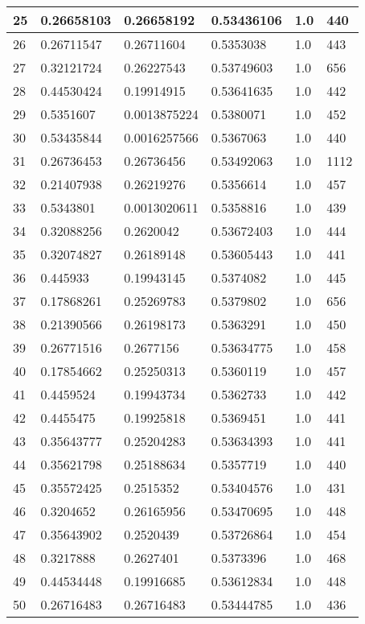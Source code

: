 \begin{longtable}{|l|l|l|l|l|l|}
25 & 0.26658103 & 0.26658192 & 0.53436106 & 1.0 & 440 \\ \hline 
26 & 0.26711547 & 0.26711604 & 0.5353038 & 1.0 & 443 \\ \hline 
27 & 0.32121724 & 0.26227543 & 0.53749603 & 1.0 & 656 \\ \hline 
28 & 0.44530424 & 0.19914915 & 0.53641635 & 1.0 & 442 \\ \hline 
29 & 0.5351607 & 0.0013875224 & 0.5380071 & 1.0 & 452 \\ \hline 
30 & 0.53435844 & 0.0016257566 & 0.5367063 & 1.0 & 440 \\ \hline 
31 & 0.26736453 & 0.26736456 & 0.53492063 & 1.0 & 1112 \\ \hline 
32 & 0.21407938 & 0.26219276 & 0.5356614 & 1.0 & 457 \\ \hline 
33 & 0.5343801 & 0.0013020611 & 0.5358816 & 1.0 & 439 \\ \hline 
34 & 0.32088256 & 0.2620042 & 0.53672403 & 1.0 & 444 \\ \hline 
35 & 0.32074827 & 0.26189148 & 0.53605443 & 1.0 & 441 \\ \hline 
36 & 0.445933 & 0.19943145 & 0.5374082 & 1.0 & 445 \\ \hline 
37 & 0.17868261 & 0.25269783 & 0.5379802 & 1.0 & 656 \\ \hline 
38 & 0.21390566 & 0.26198173 & 0.5363291 & 1.0 & 450 \\ \hline 
39 & 0.26771516 & 0.2677156 & 0.53634775 & 1.0 & 458 \\ \hline 
40 & 0.17854662 & 0.25250313 & 0.5360119 & 1.0 & 457 \\ \hline 
41 & 0.4459524 & 0.19943734 & 0.5362733 & 1.0 & 442 \\ \hline 
42 & 0.4455475 & 0.19925818 & 0.5369451 & 1.0 & 441 \\ \hline 
43 & 0.35643777 & 0.25204283 & 0.53634393 & 1.0 & 441 \\ \hline 
44 & 0.35621798 & 0.25188634 & 0.5357719 & 1.0 & 440 \\ \hline 
45 & 0.35572425 & 0.2515352 & 0.53404576 & 1.0 & 431 \\ \hline 
46 & 0.3204652 & 0.26165956 & 0.53470695 & 1.0 & 448 \\ \hline 
47 & 0.35643902 & 0.2520439 & 0.53726864 & 1.0 & 454 \\ \hline 
48 & 0.3217888 & 0.2627401 & 0.5373396 & 1.0 & 468 \\ \hline 
49 & 0.44534448 & 0.19916685 & 0.53612834 & 1.0 & 448 \\ \hline 
50 & 0.26716483 & 0.26716483 & 0.53444785 & 1.0 & 436 \\ \hline 
\end{longtable}